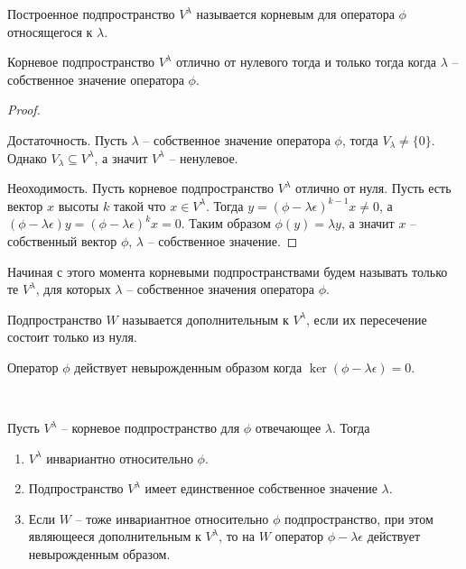 \begin{definition}
    Построенное подпространство $ V^{\lambda}$ называется корневым для оператора $\phi$ 
    относящегося к $\lambda$.
\end{definition}

\begin{proposition}
    Корневое подпространство $ V^{\lambda}$ отлично от нулевого тогда и только тогда когда 
    $\lambda$ -- собственное значение оператора $\phi$.
\end{proposition}

\begin{proof}~

    Достаточность. Пусть $\lambda$ -- собственное значение оператора $\phi$, тогда 
    $V_{\lambda} \neq \{ 0\}$. Однако $V_{\lambda} \subseteq V^{\lambda}$, а значит 
    $V^{\lambda}$ -- ненулевое.

    Неоходимость. Пусть корневое подпространство $ V^{\lambda}$ отлично от нуля. Пусть есть вектор 
    $x$ высоты $k$ такой что $x \in V^{\lambda}$. Тогда $y = (\phi - \lambda \epsilon)^{k-1} x \neq 0$,
    а $(\phi - \lambda \epsilon)y = (\phi - \lambda \epsilon)^{k} x = 0$. 
    Таким образом $\phi(y) = \lambda y$, а значит $x$ -- собственный вектор $\phi$, $\lambda$ -- 
    собственное значение.
\end{proof}

\begin{agreement}
    Начиная с этого момента корневыми подпространствами будем называть только те $V^{\lambda}$, 
    для которых $\lambda$ -- собственное значения оператора $\phi$.
\end{agreement}

\begin{reminder}
    Подпространство $W$ называется дополнительным к $V^{\lambda}$, 
    если их пересечение состоит только из нуля.
\end{reminder}

\begin{reminder}
    Оператор $\phi$ действует невырожденным образом когда $\ker(\phi - \lambda \epsilon) = 0$.
\end{reminder}

\begin{theorem}~
    \label{th5.1}

    Пусть $V^{\lambda}$ -- корневое подпространство для $\phi$ отвечающее $\lambda$. Тогда
    \begin{enumerate}
        \item $V^{\lambda}$ инвариантно относительно $\phi$.
        \item Подпространство $V^{\lambda}$ имеет единственное собственное значение $\lambda$.
        \item Если $W$ -- тоже инвариантное относительно $\phi$ подпространство, при этом являющееся 
        дополнительным к $V^{\lambda}$, то на $W$ оператор 
        $\phi - \lambda \epsilon$ действует невырожденным образом.
    \end{enumerate} 
\end{theorem}


